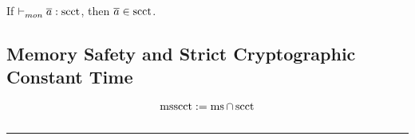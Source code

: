 \documentclass[utf8,acmsmall,review,screen,dvipsnames]{acmart}
\begin{document}
\begin{lemma}\label{lem:mon:scctsafe}
  If $\vdash^{}_{mon}{\overline{a}}:{\operatorname{scct}}$, then $\overline{a}\in\operatorname{scct}$. %
\end{lemma}
\begin{incompleteproof}
\end{incompleteproof}

\subsection{Memory Safety and Strict Cryptographic Constant Time}\label{ap:subsec:msscct}
\begin{definition}\label{ap:def:trace:msscctdef}
  \begin{displaymath}
    \operatorname{msscct}:=\operatorname{ms}\cap\operatorname{scct}
  \end{displaymath}
\end{definition}
$$\;$$
\hrule
$$\;$$
\end{document}
